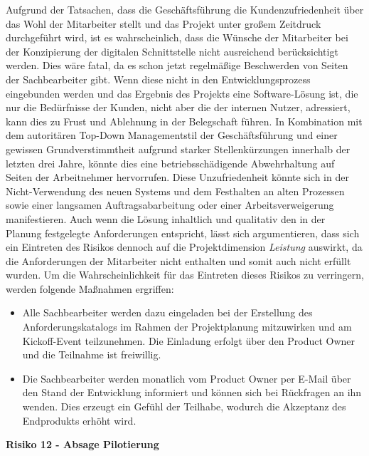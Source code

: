 Aufgrund der Tatsachen, dass die Geschäftsführung die Kundenzufriedenheit über das Wohl der Mitarbeiter stellt und das Projekt unter großem Zeitdruck durchgeführt wird, ist es wahrscheinlich, dass die Wünsche der Mitarbeiter bei der Konzipierung der digitalen Schnittstelle nicht ausreichend berücksichtigt werden. Dies wäre fatal, da es schon jetzt regelmäßige Beschwerden von Seiten der Sachbearbeiter gibt. Wenn diese nicht in den Entwicklungsprozess eingebunden werden und das Ergebnis des Projekts eine Software-Lösung ist, die nur die Bedürfnisse der Kunden, nicht aber die der internen Nutzer, adressiert, kann dies zu Frust und Ablehnung in der Belegschaft führen. In Kombination mit dem autoritären Top-Down Managementstil der Geschäftsführung und einer gewissen Grundverstimmtheit aufgrund starker Stellenkürzungen innerhalb der letzten drei Jahre, könnte dies eine betriebsschädigende Abwehrhaltung auf Seiten der Arbeitnehmer hervorrufen. Diese Unzufriedenheit könnte sich in der Nicht-Verwendung des neuen Systems und dem Festhalten an alten Prozessen sowie einer langsamen Auftragsabarbeitung oder einer Arbeitsverweigerung manifestieren. Auch wenn die Lösung inhaltlich und qualitativ den in der Planung festgelegte Anforderungen entspricht, lässt sich argumentieren, dass sich ein Eintreten des Risikos dennoch auf die Projektdimension \textit{Leistung} auswirkt, da die Anforderungen der Mitarbeiter nicht enthalten und somit auch nicht erfüllt wurden. Um die Wahrscheinlichkeit für das Eintreten dieses Risikos zu verringern, werden folgende Maßnahmen ergriffen:
\begin{itemize}
	\item Alle Sachbearbeiter werden dazu eingeladen bei der Erstellung des Anforderungskatalogs im Rahmen der Projektplanung mitzuwirken und am Kickoff-Event teilzunehmen. Die Einladung erfolgt über den Product Owner und die Teilnahme ist freiwillig.
	\item Die Sachbearbeiter werden monatlich vom Product Owner per E-Mail über den Stand der Entwicklung informiert und können sich bei Rückfragen an ihn wenden. Dies erzeugt ein Gefühl der Teilhabe, wodurch die Akzeptanz des Endprodukts erhöht wird.
\end{itemize}



\vspace*{0.3cm}
\textbf{Risiko 12 - Absage Pilotierung}
\vspace*{0.1cm}

